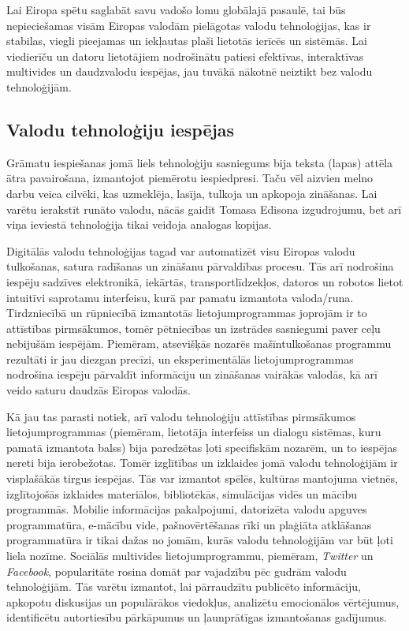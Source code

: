 \begin{multicols}{2}
Lai Eiropa spētu saglabāt savu vadošo lomu globālajā pasaulē, tai būs nepieciešamas visām Eiropas valodām pielāgotas valodu tehnoloģijas, kas ir stabilas, viegli pieejamas un iekļautas plaši lietotās ierīcēs un sistēmās. 
Lai viedierīču un datoru lietotājiem nodrošinātu patiesi efektīvas, interaktīvas multivides un daudzvalodu iespējas, jau tuvākā nākotnē neiztikt bez valodu tehnoloģijām. 

\subsection{Valodu tehnoloģiju iespējas}

Grāmatu iespiešanas jomā liels tehnoloģiju sasniegums bija teksta (lapas) attēla ātra pavairošana, izmantojot piemērotu iespiedpresi. 
Taču vēl aizvien melno darbu veica cilvēki, kas uzmeklēja, lasīja, tulkoja un apkopoja zināšanas. 
Lai varētu ierakstīt runāto valodu, nācās gaidīt Tomasa Edisona izgudrojumu, bet arī viņa ieviestā tehnoloģija tikai veidoja analogas kopijas.

Digitālās valodu tehnoloģijas tagad var automatizēt visu Eiropas valodu tulkošanas, satura radīšanas un zināšanu pārvaldības procesu. 
Tās arī nodrošina iespēju sadzīves elektronikā, iekārtās, transportlīdzekļos, datoros un robotos lietot intuitīvi saprotamu interfeisu, kurā par pamatu izmantota valoda/runa. 
Tirdzniecībā un rūpniecībā izmantotās lietojumprogrammas joprojām ir to attīstības pirmsākumos, tomēr pētniecības un izstrādes sasniegumi paver ceļu nebijušām iespējām. 
Piemēram, atsevišķās nozarēs mašīntulkošanas programmu \mbox{rezultāti} ir jau diezgan precīzi, un eksperimentālās lietojumprogrammas nodrošina iespēju pārvaldīt informāciju un zināšanas vairākās valodās, kā arī veido saturu daudzās Eiropas valodās. 

Kā jau tas parasti notiek, arī valodu tehnoloģiju attīstības pirmsākumos lietojumprogrammas (piemēram, lietotāja interfeiss un dialogu sistēmas, kuru pamatā izmantota balss) bija paredzētas ļoti specifiskām nozarēm, un to iespējas nereti bija ierobežotas. 
Tomēr izglītības un izklaides jomā valodu tehnoloģijām ir visplašākās tirgus iespējas. 
Tās var izmantot spēlēs, kultūras mantojuma vietnēs, izglītojošās izklaides materiālos, bibliotēkās, simulācijas vidēs un mācību programmās. 
Mobilie informācijas pakalpojumi, datorizēta valodu apguves programmatūra, e-mācību vide, pašnovērtēšanas rīki un plaģiāta atklāšanas programmatūra ir tikai dažas no jomām, kurās valodu tehnoloģijām var būt ļoti liela nozīme. 
Sociālās multivides lietojumprogrammu, piemēram, \textit{Twitter} un \textit{Facebook}, popularitāte rosina domāt par vajadzību pēc gudrām valodu tehnoloģijām. 
Tās varētu izmantot, lai pārraudzītu publicēto informāciju, apkopotu diskusijas un populārākos viedokļus, analizētu emocionālos vērtējumus, identificētu autortiesību pārkāpumus un ļaunprātīgas izmantošanas gadījumus.


\end{multicols}
